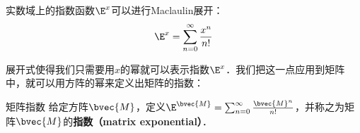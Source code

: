 
实数域上的指数函数$\E^x$可以进行Maclaulin展开：\begin{equation}
\E^x=\sum\limits_{n=0}^\infty \frac{x^n}{n!}
\end{equation}

展开式使得我们只需要用$x$的幂就可以表示指数$\E^x$．我们把这一点应用到矩阵中，就可以用方阵的幂来定义出矩阵的指数：

\begin{definition}{矩阵指数}
给定方阵$\bvec{M}$，定义$\E^\bvec{M}=\sum_{n=0}^\infty \frac{\bvec{M}^n}{n!}$，并称之为矩阵$\bvec{M}$的\textbf{指数（matrix exponential）}．
\end{definition}






